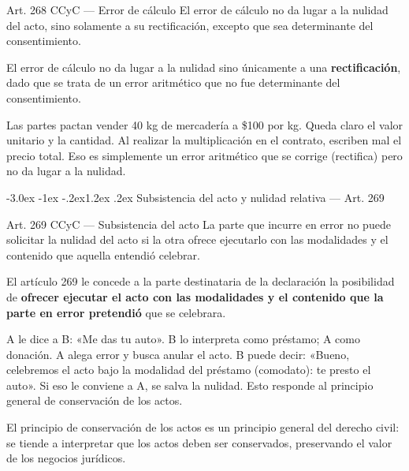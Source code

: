 \documentclass[12pt,oneside]{book}
\makeatletter
\renewcommand\section{\@startsection{section}{1}{\z@}%
  {-3.0ex \@plus -1ex \@minus -.2ex}{1.2ex \@plus .2ex}%
  {\normalfont\large\bfseries\color{acento}}}
\makeatother
\begin{document}
\begin{articulo}{Art. 268 CCyC --- Error de cálculo}
El error de cálculo no da lugar a la nulidad del acto, sino solamente a su rectificación, excepto que sea determinante del consentimiento.
\end{articulo}

El error de cálculo no da lugar a la nulidad sino únicamente a una \textbf{rectificación}, dado que se trata de un error aritmético que no fue determinante del consentimiento.

\begin{ejemplo}
Las partes pactan vender 40 kg de mercadería a \$100 por kg. Queda claro el valor unitario y la cantidad. Al realizar la multiplicación en el contrato, escriben mal el precio total. Eso es simplemente un error aritmético que se corrige (rectifica) pero no da lugar a la nulidad.
\end{ejemplo}

\section{Subsistencia del acto y nulidad relativa --- Art. 269}

\begin{articulo}{Art. 269 CCyC --- Subsistencia del acto}
La parte que incurre en error no puede solicitar la nulidad del acto si la otra ofrece ejecutarlo con las modalidades y el contenido que aquella entendió celebrar.
\end{articulo}

El artículo 269 le concede a la parte destinataria de la declaración la posibilidad de \textbf{ofrecer ejecutar el acto con las modalidades y el contenido que la parte en error pretendió} que se celebrara.

\begin{ejemplo}
A le dice a B: «Me das tu auto». B lo interpreta como préstamo; A como donación. A alega error y busca anular el acto. B puede decir: «Bueno, celebremos el acto bajo la modalidad del préstamo (comodato): te presto el auto». Si eso le conviene a A, se salva la nulidad. Esto responde al principio general de conservación de los actos.
\end{ejemplo}

\begin{importante}
El principio de conservación de los actos es un principio general del derecho civil: se tiende a interpretar que los actos deben ser conservados, preservando el valor de los negocios jurídicos.
\end{importante}
\end{document}
